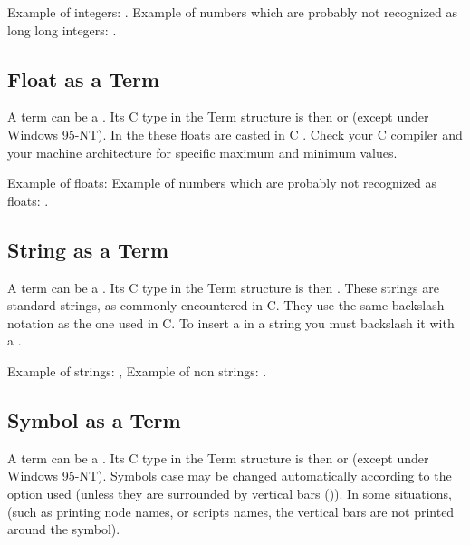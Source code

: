 Example of integers: . \*
Example of numbers which are probably not recognized as long long integers:
.

\subsection{Float as a Term}

A term can be a . Its C type in the Term structure is then
 or  (except under Windows 95-NT).  In the \CPK{}
these floats are casted in C . Check your C compiler and your
machine architecture for specific maximum and minimum values.

Example of floats:  \* 
Example of numbers which are probably not recognized as floats: .

\subsection{String as a Term}

A term can be a . Its C type in the Term structure is then
. These strings are standard strings, as commonly encountered in
C. They use the same backslash notation as the one used in C. To insert a
 in a string you must backslash it with a \samp{\\}.

Example of strings: , \*
 \*
Example of non strings: .

\subsection{Symbol as a Term}

A term can be a . Its C type in the Term structure is then
 or  (except under Windows 95-NT). Symbols case may be
changed automatically according to the option used (unless they are surrounded
by vertical bars (\samp{|})). In some situations, (such as printing node names,
or scripts names, the vertical bars are not printed around the symbol).

